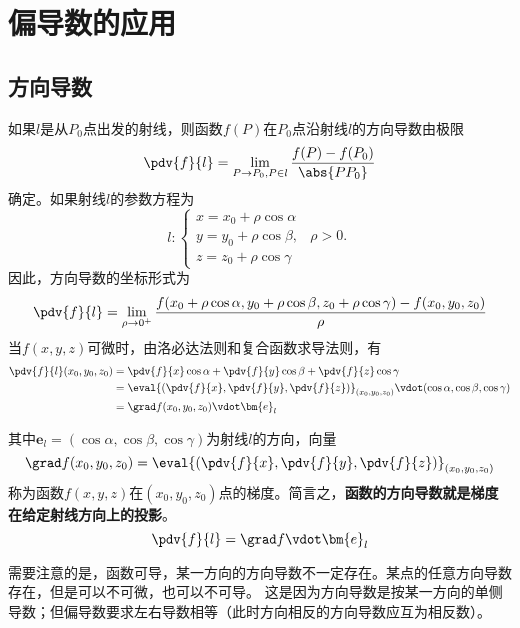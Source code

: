 \section{偏导数的应用}
\subsection{方向导数}
如果$l$是从$P_0$点出发的射线，则函数$f(P)$在$P_0$点沿射线$l$的方向导数由极限
\begin{equation}
    \pdv{f}{l} = \lim_{P\to P_0,P\in l}\frac{f(P)-f(P_0)}{\abs{PP_0}}
\end{equation}
确定。如果射线$l$的参数方程为
\[
    l:
    \begin{cases}
        x = x_0 + \rho\cos\alpha &          \\
        y = y_0 + \rho\cos\beta, & \rho >0. \\
        z = z_0 + \rho\cos\gamma &
    \end{cases}
\]
因此，方向导数的坐标形式为
\begin{equation}
    \pdv{f}{l} = \lim_{\rho\to 0^+}\frac{f(x_0 + \rho\cos\alpha,y_0 + \rho\cos\beta,z_0 + \rho\cos\gamma)-f(x_0,y_0,z_0)}{\rho}
\end{equation}
当$f(x,y,z)$可微时，由洛必达法则和复合函数求导法则，有
\begin{align*}
    \pdv{f}{l}(x_0,y_0,z_0)
     & = \pdv{f}{x}\cos\alpha + \pdv{f}{y}\cos\beta + \pdv{f}{z}\cos\gamma                                          \\
     & = \eval{\left(\pdv{f}{x},\pdv{f}{y},\pdv{f}{z}\right)}_{(x_0,y_0,z_0)}\vdot(\cos\alpha,\cos\beta,\cos\gamma) \\
     & = \grad f(x_0,y_0,z_0)\vdot \bm{e}_l
\end{align*}

其中$\bm{e}_l=(\cos\alpha,\cos\beta,\cos\gamma)$为射线$l$的方向，向量
\begin{equation}
    \grad f(x_0,y_0,z_0)=\eval{\left(\pdv{f}{x},\pdv{f}{y},\pdv{f}{z}\right)}_{(x_0,y_0,z_0)}
\end{equation}
称为函数$f(x,y,z)$在$(x_0,y_0,z_0)$点的梯度。简言之，\textbf{\textsf{函数的方向导数就是梯度在给定射线方向上的投影}}。
\begin{equation}
    \pdv{f}{l} = \grad f\vdot \bm{e}_l
\end{equation}

需要注意的是，函数可导，某一方向的方向导数不一定存在。某点的任意方向导数存在，但是可以不可微，也可以不可导。
这是因为方向导数是按某一方向的单侧导数；但偏导数要求左右导数相等（此时方向相反的方向导数应互为相反数）。


